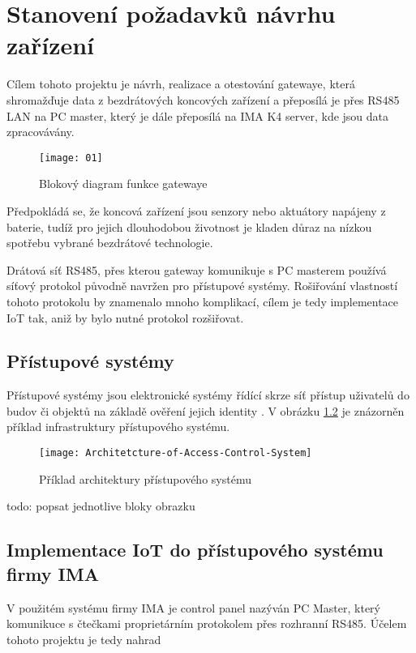 \chapter{Stanovení požadavků návrhu zařízení}

Cílem tohoto projektu je návrh, realizace a otestování gatewaye, která shromažďuje data z bezdrátových koncových zařízení a přeposílá je přes RS485 LAN na PC master, který je dále přeposílá na IMA K4 server, kde jsou data zpracovávány.

\begin{figure}[!h]
    \centering
    \texttt{[image: 01]}
    \caption{Blokový diagram funkce gatewaye}
    \label{fig:block diagram of the system}
\end{figure}

Předpokládá se, že koncová zařízení jsou senzory nebo aktuátory napájeny z baterie, tudíž pro jejich dlouhodobou životnost je kladen důraz na nízkou spotřebu vybrané bezdrátové technologie.

Drátová síť RS485, přes kterou gateway komunikuje s PC masterem používá síťový protokol původně navržen pro přístupové systémy. 
Rošiřování vlastností tohoto protokolu by znamenalo mnoho komplikací, cílem je tedy implementace IoT tak, aniž by bylo nutné protokol rozšiřovat.

\section{Přístupové systémy}
Přístupové systémy jsou elektronické systémy řídící skrze síť přístup uživatelů do budov či objektů na základě ověření jejich identity \cite{accessControlSystem_eiprocus}.
V obrázku \ref{fig:Access control system architecture} je znázorněn příklad infrastruktury přístupového systému.

\begin{figure}[!h]
    \centering
    \texttt{[image: Architetcture-of-Access-Control-System]}
    \caption{Příklad architektury přístupového systému \cite{accessControlSystem_eiprocus}}
    \label{fig:Access control system architecture}
\end{figure}

todo: popsat jednotlive bloky obrazku

\section{Implementace IoT do přístupového systému firmy IMA}
V použitém systému firmy IMA je control panel nazýván PC Master, který komunikuce s čtečkami proprietárním protokolem přes rozhranní RS485.
Účelem tohoto projektu je tedy nahrad


